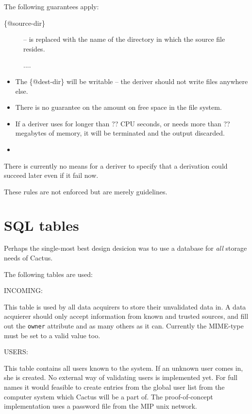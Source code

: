 The following guarantees apply:


\begin{description}
  
\item[\{@source-dir\}] -- is replaced with the name of the directory
  in which the source file resides.

\textsf{....}


\end{description}
\begin{itemize}
\item The \{@dest-dir\} will be writable -- the deriver should not write files anywhere else.
\item There is no guarantee on the amount on free space in the file system.
\item If a deriver uses for longer than \textsf{??} CPU seconds, or needs more than \textsf{??} megabytes of memory, it  will be terminated and the output discarded.  
\item 
\end{itemize}

There is currently no means for a deriver to specify that a derivation could succeed later even if it fail now.

These rules are not enforced but are merely guidelines.

\section{SQL tables}

Perhaps the single-most best design desicion was to use a database for \textit{all} storage needs of Cactus.

The following tables are used:

INCOMING:

This table is used by all data acquirers to store their unvalidated data in.  A
data acquierer should only accept information from known and trusted sources,
and fill out the \texttt{owner} attribute and as many others as it can.
Currently the MIME-type must be set to a valid value too.

USERS:

This table contains all users known to the system.  If an unknown user comes in, she is created.  No external way of validating users is implemented yet.  For full names it would feasible to create entries from the global user list from the computer system which Cactus will be a part of.  The proof-of-concept implementation uses a password file from the MIP unix network.



